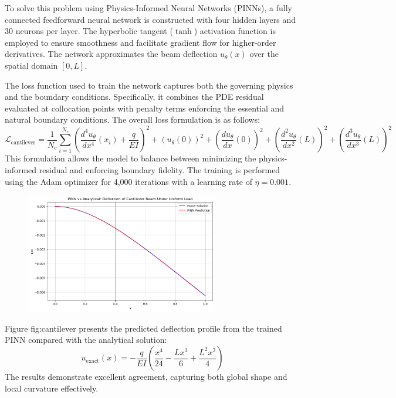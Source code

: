 \documentclass[12pt]{article}
\begin{document}
To solve this problem using Physics-Informed Neural Networks (PINNs), a fully connected feedforward neural network is constructed with four hidden layers and 30 neurons per layer. The hyperbolic tangent ($\tanh$) activation function is employed to ensure smoothness and facilitate gradient flow for higher-order derivatives. The network approximates the beam deflection $u_\theta(x)$ over the spatial domain $[0,L]$.

The loss function used to train the network captures both the governing physics and the boundary conditions. Specifically, it combines the PDE residual evaluated at collocation points with penalty terms enforcing the essential and natural boundary conditions. The overall loss formulation is as follows:
\[
\mathcal{L}_{\text{cantilever}} = \frac{1}{N_c}\sum_{i=1}^{N_c}\left(\frac{d^4u_{\theta}}{dx^4}(x_i) + \frac{q}{EI}\right)^2 + 
\left(u_{\theta}(0)\right)^2 + \left(\frac{du_{\theta}}{dx}(0)\right)^2 + 
\left(\frac{d^2u_{\theta}}{dx^2}(L)\right)^2 + \left(\frac{d^3u_{\theta}}{dx^3}(L)\right)^2
\]
This formulation allows the model to balance between minimizing the physics-informed residual and enforcing boundary fidelity. The training is performed using the Adam optimizer for 4,000 iterations with a learning rate of $\eta=0.001$.

\begin{figure}[htbp]
    \centering
    \includegraphics[width=0.75\textwidth]{cantilever_results.png}
    \caption{}
    \label{fig:cantilever}
\end{figure}

Figure {fig:cantilever} presents the predicted deflection profile from the trained PINN compared with the analytical solution:
\[
u_{\text{exact}}(x) = -\frac{q}{EI}\left(\frac{x^4}{24} - \frac{Lx^3}{6} + \frac{L^2x^2}{4}\right)
\]
The results demonstrate excellent agreement, capturing both global shape and local curvature effectively.
\end{document}
